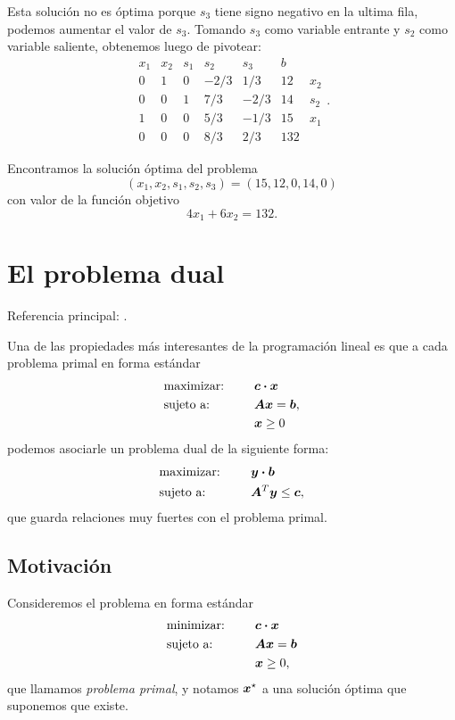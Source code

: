 Esta solución no es óptima porque $s_3$ tiene signo negativo en la ultima fila, podemos aumentar el valor de $s_3$.
Tomando $s_3$ como variable entrante y $s_2$ como variable saliente, obtenemos luego de pivotear:
$$
\begin{array}{ccccccc}
x_1 & x_2 & s_1 & s_2 & s_3 & b & \\ \hline
0 & 1 & 0 & -2/3 & 1/3 & 12 & x_2 \\
0 & 0 & 1 & 7/3 & -2/3 & 14 & s_2 \\
1 & 0 & 0 & 5/3 & -1/3 & 15 & x_1 \\ \hline
0 & 0 & 0 & 8/3 & 2/3 & 132 &
\end{array}.
$$


Encontramos la solución óptima del problema
$$
(x_1, x_2, s_1, s_2, s_3) = (15, 12, 0, 14, 0)
$$
con valor de la función objetivo
$$
4 x_1 + 6 x_2 = 132.
$$







\section{El problema dual}

\noindent Referencia principal: \cite[Capítulo 4]{Bertsimas1997}.

Una de las propiedades m\'as interesantes de la programaci\'on lineal es que a cada problema primal en forma estándar
\begin{alignat*}{2}
  & \text{maximizar: } & & \bm{c} \boldsymbol{\cdot} \bm{x}  \\
   & \text{sujeto a: } & \quad & \bm{A} \bm{x} = \bm{b}, \\
   &&& \bm{x} \ge 0
\end{alignat*}
podemos asociarle un problema dual de la siguiente forma:
\begin{alignat*}{2}
  & \text{maximizar: } & & \bm{y} \boldsymbol{\cdot} \bm{b}  \\
   & \text{sujeto a: } & \quad & \bm{A}^T \bm{y} \le \bm{c}, \\
\end{alignat*}
que guarda relaciones muy fuertes con el problema primal.

\subsection{Motivación}

Consideremos el problema en forma estándar
\begin{alignat*}{2}
  & \text{minimizar: } & & \bm{c} \boldsymbol{\cdot} \bm{x}  \\
   & \text{sujeto a: } & \quad & \bm{A} \bm{x} = \bm{b} \\
   & & & \bm{x} \ge 0,
\end{alignat*}
que llamamos \emph{problema primal}, y notamos $\bm{x}^\star$ a una solución óptima que suponemos que existe.

